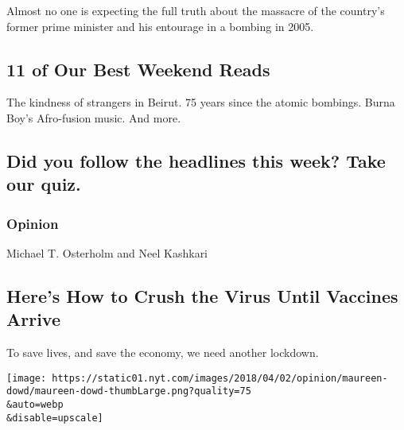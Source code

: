 Almost no one is expecting the full truth about the massacre of the
country's former prime minister and his entourage in a bombing in 2005.

\href{/2020/08/07/briefing/best-weekend-reads.html}{}

\hypertarget{11-of-our-best-weekend-reads}{%
\subsection{11 of Our Best Weekend
Reads}\label{11-of-our-best-weekend-reads}}

The kindness of strangers in Beirut. 75 years since the atomic bombings.
Burna Boy's Afro-fusion music. And more.

\href{/interactive/2020/08/07/briefing/beirut-tiktok-census-bureau-news-quiz.html}{}

\hypertarget{did-you-follow-the-headlines-this-week-take-our-quiz}{%
\subsection{Did you follow the headlines this week? Take our
quiz.}\label{did-you-follow-the-headlines-this-week-take-our-quiz}}

\href{/2020/08/07/briefing/best-weekend-reads.html}{}

\href{https://www.nytimes.com/section/opinion?pagetype=Homepage\&action=click\&module=Opinion}{}

\hypertarget{opinion}{%
\subsubsection{Opinion}\label{opinion}}

\href{/2020/08/07/opinion/coronavirus-lockdown-unemployment-death.html}{}

Michael T. Osterholm and Neel Kashkari

\hypertarget{heres-how-to-crush-the-virus-until-vaccines-arrive}{%
\subsection{Here's How to Crush the Virus Until Vaccines
Arrive}\label{heres-how-to-crush-the-virus-until-vaccines-arrive}}

To save lives, and save the economy, we need another lockdown.

\href{/2020/08/08/opinion/sunday/biden-vice-president-geraldine-ferraro.html}{}

\texttt{[image: https://static01.nyt.com/images/2018/04/02/opinion/maureen-dowd/maureen-dowd-thumbLarge.png?quality=75\\\&auto=webp\\\&disable=upscale]}

